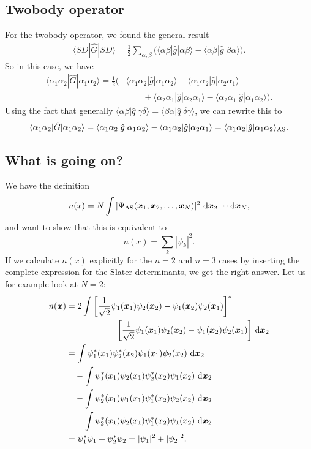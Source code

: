 \documentclass[a4paper, 11pt, notitlepage, english]{article}
\newcommand{\op}[1]{\hat{#1}}
\newcommand{\braopket}[3]{\langle #1 | {#2} | #3 \rangle}
\renewcommand{\d}{{\rm d}}
\newcommand{\bt}[1]{\boldsymbol{#1}}
\begin{document}
\subsection*{Twobody operator}
For the twobody operator, we found the general result
\begin{align*}
\braopket{SD}{\op{G}}{SD}
=  \frac{1}{2}\sum_{\alpha,\beta} \bigg(\braopket{\alpha\beta}{\op{g}}{\alpha\beta} - \braopket{\alpha\beta}{\op{g}}{\beta\alpha}\bigg).
\end{align*}
So in this case, we have
\begin{align*}	
\braopket{\alpha_1 \alpha_2}{\op{G}}{\alpha_1 \alpha_2} = \frac{1}{2}\bigg(
&\braopket{\alpha_1\alpha_2}{\op{g}}{\alpha_1\alpha_2} -\braopket{\alpha_1\alpha_2}{\op{g}}{\alpha_2\alpha_1} \\
&\qquad+ \braopket{\alpha_2\alpha_1}{\op{g}}{\alpha_2\alpha_1} - \braopket{\alpha_2\alpha_1}{\op{g}}{\alpha_1\alpha_2} \bigg).
\end{align*}
Using the fact that generally $\braopket{\alpha\beta}{\op{q}}{\gamma\delta} = \braopket{\beta\alpha}{\op{q}}{\delta\gamma}$, we can rewrite this to 
$$\braopket{\alpha_1 \alpha_2}{\op{G}}{\alpha_1 \alpha_2} = 
\braopket{\alpha_1\alpha_2}{\op{g}}{\alpha_1\alpha_2} -\braopket{\alpha_1\alpha_2}{\op{g}}{\alpha_2\alpha_1} = \braopket{\alpha_1\alpha_2}{\op{g}}{\alpha_1\alpha_2}_{\rm AS}.$$


\clearpage

\subsection*{What is going on?}
We have the definition
$$n(x) = N\int |\Psi_{\rm AS}(\bt{x}_1, \bt{x}_2, \ldots, \bt{x}_N)|^2 \ \d \bt{x}_2 \cdots \d \bt{x}_N,$$
and want to show that this is equivalent to
$$n(x) = \sum_k |\psi_k|^2.$$
If we calculate $n(x)$ explicitly for the $n=2$ and $n=3$ cases by inserting the complete expression for the Slater determinants, we get the right answer. Let us for example look at $N=2$:
\begin{align*}
n(\bt{x}) &= 2 \int \bigg[\frac{1}{\sqrt{2}}\psi_1(\bt{x}_1)\psi_2(\bt{x}_2) - \psi_1(\bt{x}_2)\psi_2(\bt{x}_1)\bigg]^* \\
&\qquad\qquad\qquad \bigg[\frac{1}{\sqrt{2}}\psi_1(\bt{x}_1)\psi_2(\bt{x}_2) - \psi_1(\bt{x}_2)\psi_2(\bt{x}_1)\bigg] \ \d \bt{x}_2 \\
&= \int \psi_1^*(x_1)\psi_2^*(x_2)\psi_1(x_1)\psi_2(x_2) \ \d \bt{x}_2 \\
&\quad- \int \psi_1^*(x_1)\psi_2(x_1)\psi_2^*(x_2)\psi_1(x_2) \ \d \bt{x}_2 \\
&\quad- \int \psi_2^*(x_1)\psi_1(x_1)\psi_1^*(x_2)\psi_2(x_2) \ \d \bt{x}_2 \\
&\quad+ \int \psi_2^*(x_1)\psi_2(x_1)\psi_1^*(x_2)\psi_1(x_2) \ \d \bt{x}_2 \\
&= \psi_1^*\psi_1 +  \psi_2^*\psi_2 = |\psi_1|^2 + |\psi_2|^2.
\end{align*}
\end{document}
